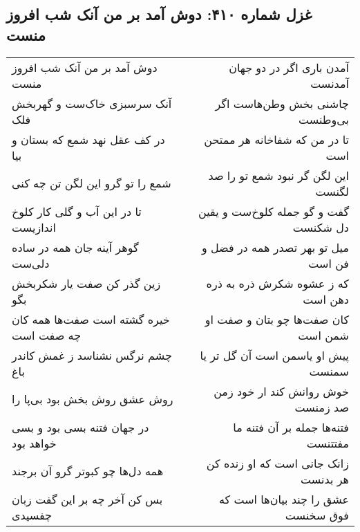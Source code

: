 \begin{center}
\section*{غزل شماره ۴۱۰: دوش آمد بر من آنک شب افروز منست}
\label{sec:0410}
\begin{longtable}{l p{0.5cm} r}
دوش آمد بر من آنک شب افروز منست
&&
آمدن باری اگر در دو جهان آمدنست
\\
آنک سرسبزی خاک‌ست و گهربخش فلک
&&
چاشنی بخش وطن‌هاست اگر بی‌وطنست
\\
در کف عقل نهد شمع که بستان و بیا
&&
تا در من که شفاخانه هر ممتحن است
\\
شمع را تو گرو این لگن تن چه کنی
&&
این لگن گر نبود شمع تو را صد لگنست
\\
تا در این آب و گلی کار کلوخ اندازیست
&&
گفت و گو جمله کلوخ‌ست و یقین دل شکنست
\\
گوهر آینه جان همه در ساده دلی‌ست
&&
میل تو بهر تصدر همه در فضل و فن است
\\
زین گذر کن صفت یار شکربخش بگو
&&
که ز عشوه شکرش ذره به ذره دهن است
\\
خیره گشته است صفت‌ها همه کان چه صفت است
&&
کان صفت‌ها چو بتان و صفت او شمن است
\\
چشم نرگس نشناسد ز غمش کاندر باغ
&&
پیش او یاسمن است آن گل تر یا سمنست
\\
روش عشق روش بخش بود بی‌پا را
&&
خوش روانش کند ار خود زمن صد زمنست
\\
در جهان فتنه بسی بود و بسی خواهد بود
&&
فتنه‌ها جمله بر آن فتنه ما مفتتنست
\\
همه دل‌ها چو کبوتر گرو آن برجند
&&
زانک جانی است که او زنده کن هر بدنست
\\
بس کن آخر چه بر این گفت زبان چفسیدی
&&
عشق را چند بیان‌ها است که فوق سخنست
\\
\end{longtable}
\end{center}
